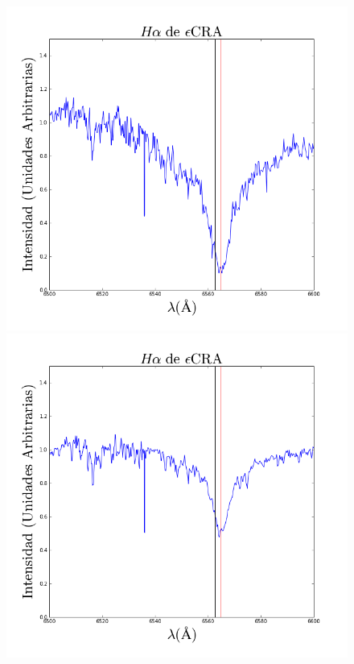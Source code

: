 \documentclass[Proceedings]{ascelike}
\begin{document}
\begin{figure}
\centering
\includegraphics[scale=0.33]{ha1.png}
\includegraphics[scale=0.33]{ha2.png}

\end{figure}
\end{document}
